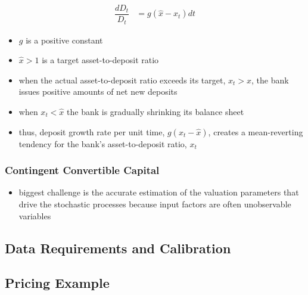 \begin{align}\label{depositgrowthprocess}
\dfrac{dD_t}{D_t} &= g\left(\hat{x} - x_t \right)dt
\end{align}

\begin{itemize}
\item $g$ is a positive constant
\item $\hat{x} > 1$ is a target asset-to-deposit ratio
\item when the actual asset-to-deposit ratio exceeds its target, $x_t > \hat{x}$, the bank issues positive amounts of net new deposits
\item when $x_t < \hat{x}$ the bank is gradually shrinking its balance sheet
\item thus, deposit growth rate per unit time, $g\left( x_t - \hat{x} \right)$, creates a mean-reverting tendency for the bank's asset-to-deposit ratio, $x_t$ 
\end{itemize}


\subsubsection{Contingent Convertible Capital}

\begin{itemize}
\item biggest challenge is the accurate estimation of the valuation parameters that drive the stochastic processes\citep{de2014handbook} because input factors are often unobservable variables
\end{itemize}

\subsection{Data Requirements and Calibration}

\subsection{Pricing Example}



